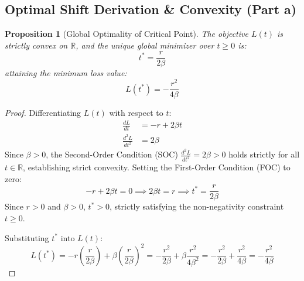\documentclass[11pt,a4paper]{article}
\theoremstyle{definition}
\theoremstyle{plain}
\newtheorem{proposition}[theorem]{Proposition}
\theoremstyle{remark}
\newcommand{\R}{\mathbb{R}}
\begin{document}
\subsection{Optimal Shift Derivation \& Convexity (Part a)}
\begin{proposition}[Global Optimality of Critical Point]
The objective $L(t)$ is strictly convex on $\R$, and the unique global minimizer over $t \ge 0$ is:
\begin{equation}
t^* = \frac{r}{2\beta}
\label{eq:opt_drift}
\end{equation}
attaining the minimum loss value:
\begin{equation}
L(t^*) = -\frac{r^2}{4\beta}
\label{eq:min_loss}
\end{equation}
\end{proposition}

\begin{proof}
Differentiating $L(t)$ with respect to $t$:
\begin{align}
\frac{dL}{dt} &= -r + 2\beta t \label{eq:foc} \\
\frac{d^2L}{dt^2} &= 2\beta \label{eq:soc}
\end{align}
Since $\beta > 0$, the Second-Order Condition (SOC) $\frac{d^2L}{dt^2} = 2\beta > 0$ holds strictly for all $t \in \R$, establishing strict convexity. Setting the First-Order Condition (FOC) to zero:
\begin{equation}
-r + 2\beta t = 0 \implies 2\beta t = r \implies t^* = \frac{r}{2\beta}
\end{equation}
Since $r > 0$ and $\beta > 0$, $t^* > 0$, strictly satisfying the non-negativity constraint $t \ge 0$.

Substituting $t^*$ into $L(t)$:
\begin{equation}
L(t^*) = -r\left(\frac{r}{2\beta}\right) + \beta\left(\frac{r}{2\beta}\right)^2 = -\frac{r^2}{2\beta} + \beta \frac{r^2}{4\beta^2} = -\frac{r^2}{2\beta} + \frac{r^2}{4\beta} = -\frac{r^2}{4\beta}
\end{equation}
\end{proof}
\end{document}
